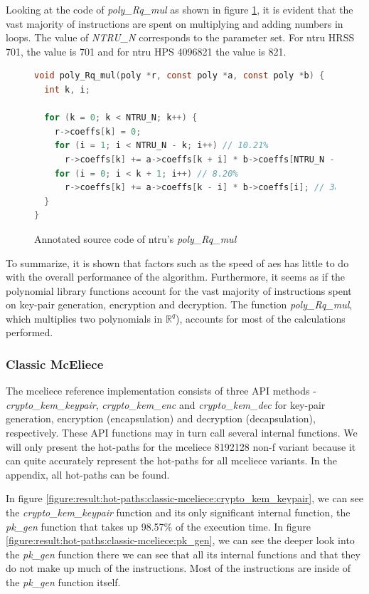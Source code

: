 Looking at the code of \textit{poly\_Rq\_mul} as shown in figure \ref{figure:result:hot-paths:ntru:poly_Rq_mul}, it is evident that the vast majority of instructions are spent on multiplying and adding numbers in loops. The value of \textit{NTRU\_N} corresponds to the parameter set. For \gls{ntru} HRSS 701, the value is 701 and for \gls{ntru} HPS 4096821 the value is 821.

\begin{figure}[H]
    \centering
    \begin{lstlisting}[language=C]
void poly_Rq_mul(poly *r, const poly *a, const poly *b) {
  int k, i;

  for (k = 0; k < NTRU_N; k++) {
    r->coeffs[k] = 0;
    for (i = 1; i < NTRU_N - k; i++) // 10.21%
      r->coeffs[k] += a->coeffs[k + i] * b->coeffs[NTRU_N - i]; // 42.75%
    for (i = 0; i < k + 1; i++) // 8.20%
      r->coeffs[k] += a->coeffs[k - i] * b->coeffs[i]; // 38.79%
  }
}
    \end{lstlisting}
    \caption{Annotated source code of \gls{ntru}'s \textit{poly\_Rq\_mul}}
    \label{figure:result:hot-paths:ntru:poly_Rq_mul}
\end{figure}

To summarize, it is shown that factors such as the speed of \gls{aes} has little to do with the overall performance of the algorithm. Furthermore, it seems as if the polynomial library functions account for the vast majority of instructions spent on key-pair generation, encryption and decryption. The function \textit{poly\_Rq\_mul}, which multiplies two polynomials in $\mathbb{R}^q$), accounts for most of the calculations performed.

\subsubsection{Classic McEliece}
The \gls{mceliece} reference implementation consists of three API methods - \textit{crypto\_kem\_keypair}, \textit{crypto\_kem\_enc} and \textit{crypto\_kem\_dec} for key-pair generation, encryption (encapsulation) and decryption (decapsulation), respectively. These API functions may in turn call several internal functions. We will only present the hot-paths for the \gls{mceliece} 8192128 non-f variant because it can quite accurately represent the hot-paths for all \gls{mceliece} variants. In the appendix, all hot-paths can be found. 

In figure \ref{figure:result:hot-paths:classic-mceliece:crypto_kem_keypair}, we can see the \textit{crypto\_kem\_keypair} function and its only significant internal function, the \textit{pk\_gen} function that takes up 98.57\% of the execution time. In figure \ref{figure:result:hot-paths:classic-mceliece:pk_gen}, we can see the deeper look into the \textit{pk\_gen} function there we can see that all its internal functions and that they do not make up much of the instructions. Most of the instructions are inside of the \textit{pk\_gen} function itself.

